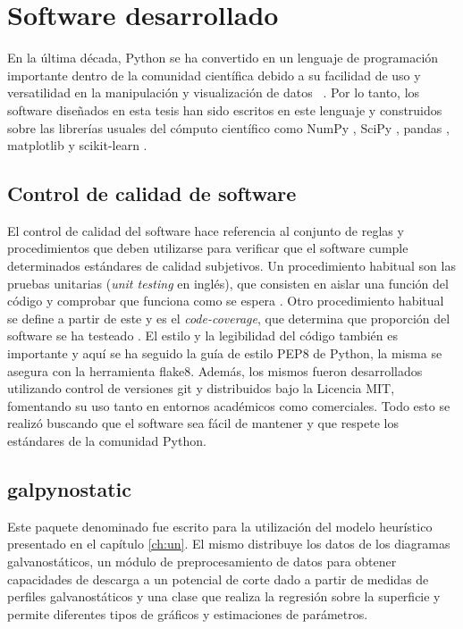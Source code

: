 \chapter{Software desarrollado}\label{a:software}

En la última década, Python se ha convertido en un lenguaje de programación 
importante dentro de la comunidad científica debido a su facilidad de uso y 
versatilidad en la manipulación y visualización de datos ~\cite{millman2011}. 
Por lo tanto, los software diseñados en esta tesis han sido escritos en este
lenguaje y construidos sobre las librerías usuales del cómputo científico como
NumPy \cite{numpy}, SciPy \cite{scipy}, pandas \cite{pandas}, 
matplotlib \cite{matplotlib} y scikit-learn \cite{sklearn1, sklearn2}. 


\section{Control de calidad de software}

El control de calidad del software hace referencia al conjunto de reglas y 
procedimientos que deben utilizarse para verificar que el software cumple 
determinados estándares de calidad subjetivos. Un procedimiento habitual son las 
pruebas unitarias (\textit{unit testing} en inglés), que consisten en aislar una 
función del código y comprobar que funciona como se espera \cite{jazayeri2007}. 
Otro procedimiento habitual se define a partir de este y es el 
\textit{code-coverage}, que determina que proporción del software se ha testeado
\cite{miller1963}. El estilo y la legibilidad del código también es importante
y aquí se ha seguido la guía de estilo PEP8 de Python, la misma se asegura con 
la herramienta flake8. Además, los mismos fueron desarrollados utilizando control 
de versiones git y distribuidos bajo la Licencia MIT, fomentando su uso tanto en 
entornos académicos como comerciales. Todo esto se realizó buscando que el 
software sea fácil de mantener y que respete los estándares de la comunidad Python.


\section{galpynostatic}\label{software:galpynostatic}

Este paquete denominado  fue escrito para la utilización
del modelo heurístico presentado en el capítulo \ref{ch:un}. El mismo distribuye 
los datos de los diagramas galvanostáticos, un módulo de preprocesamiento de datos
para obtener capacidades de descarga a un potencial de corte dado a partir de 
medidas de perfiles galvanostáticos y una clase que realiza la regresión sobre la 
superficie y permite diferentes tipos de gráficos y estimaciones de parámetros.

